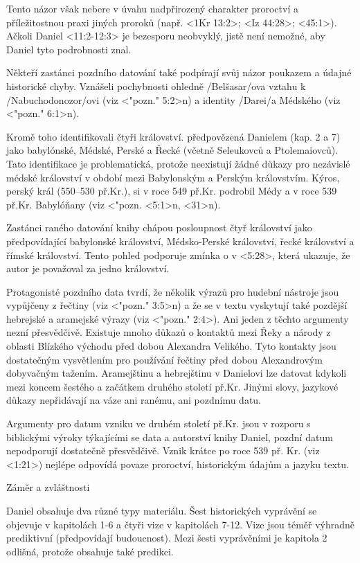 Tento názor však nebere v úvahu nadpřirozený charakter proroctví a příležitostnou
praxi jiných proroků (např. <1Kr 13:2>; <Iz 44:28>; <45:1>).
Ačkoli Daniel <11:2-12:3> je bezesporu neobvyklý,  jistě není nemožné, aby Daniel tyto podrobnosti znal.

Někteří zastánci pozdního datování také podpírají svůj názor poukazem a údajné 
historické chyby. Vznášeli pochybnosti ohledně \x/Belšasar/ova
vztahu k \x/Nabuchodonozor/ovi (viz <"pozn." 5:2>n) a
identity \x/Darei/a Médského (viz <"pozn."  6:1>n).

Kromě toho identifikovali čtyři království.
předpovězená Danielem (kap. 2 a 7) jako babylónské,
Médské, Perské a Řecké (včetně Seleukovců a Ptolemaiovců).
Tato identifikace je problematická, protože neexistují žádné důkazy pro
nezávislé médské království v období mezi Babylonským a Perským královstvím.
Kýros, perský král (550--530 př.Kr.), si v roce 549 př.Kr. podrobil Médy a v roce 539 př.Kr. 
Babylóňany (viz <"pozn.  <5:1>n, <31>n).

Zastánci raného datování knihy chápou posloupnost čtyř království jako
předpovídající babylonské království, Médsko-Perské království, řecké království a římské království.
Tento pohled podporuje  zmínka o  v <5:28>, která ukazuje, že autor je považoval za jedno království.

Protagonisté  pozdního data  tvrdí, že několik  výrazů pro hudební nástroje jsou vypůjčeny z řečtiny (viz
<"pozn."  3:5>n) a že se v textu vyskytují také pozdější hebrejské a aramejské výrazy (viz <"pozn."  2:4>). Ani jeden z těchto
argumenty nezní přesvědčivě.
Existuje mnoho důkazů o kontaktů mezi Řeky a národy z oblasti Blízkého východu před dobou Alexandra Velikého.
Tyto kontakty jsou dostatečným vysvětlením pro používání řečtiny před dobou Alexandrovým dobyvačným tažením.
Aramejštinu a hebrejštinu v Danielovi lze datovat kdykoli mezi koncem šestého a začátkem druhého století př.Kr.
Jinými slovy, jazykové důkazy nepřidávají na váze ani ranému, ani pozdnímu datu.

Argumenty pro datum vzniku ve druhém století př.Kr. jsou v rozporu s biblickými výroky týkajícími se data
a autorství knihy Daniel, pozdní datum nepodporují dostatečně přesvědčivě.
Vznik krátce po roce 539 př. Kr. (viz <1:21>) nejlépe odpovídá povaze proroctví, historickým údajům a jazyku textu.

Záměr a zvláštnosti

Daniel obsahuje dva různé typy materiálu. Šest historických vyprávění se objevuje v kapitolách 1-6 a čtyři
vize v kapitolách 7-12.
Vize jsou téměř výhradně prediktivní (předpovídají budoucnost).
Mezi šesti vyprávěními je kapitola 2 odlišná, protože obsahuje také predikci.


